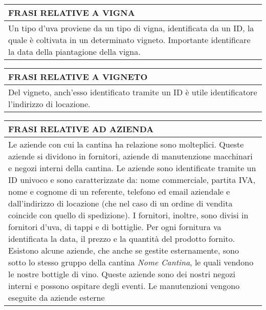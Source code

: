 \begin{center}
	\vspace{0.5cm}

	\begin{tabular}{P{16cm}}
		\toprule
		 \textbf {\large {FRASI RELATIVE A VIGNA}} \\
		\midrule
		Un tipo d'uva proviene da un tipo di vigna, identificata da un ID, la quale è coltivata in un determinato vigneto. Importante identificare la data della piantagione della vigna.\\
		\bottomrule
	\end{tabular}

	\vspace{0.5cm}
	
	\begin{tabular}{P{16cm}}
		\toprule
		 \textbf {\large {FRASI RELATIVE A VIGNETO}} \\
		\midrule
		Del vigneto, anch'esso identificato tramite un ID è utile identificatore l'indirizzo di locazione.\\
		\bottomrule
	\end{tabular}
	
	\vspace{0.5cm}
	
	\begin{tabular}{P{16cm}}
		\toprule
		 \textbf {\large {FRASI RELATIVE AD AZIENDA}} \\
		\midrule
		Le aziende con cui la cantina ha relazione sono molteplici. Queste aziende si dividono in fornitori, aziende di manutenzione macchinari e negozi interni della cantina. Le aziende sono identificate tramite un ID univoco e sono caratterizzate da: nome commerciale, partita IVA, nome e cognome di un referente, telefono ed email aziendale e dall'indirizzo di locazione (che nel caso di un ordine di vendita coincide con quello di spedizione). I fornitori, inoltre, sono divisi in fornitori d'uva, di tappi e di bottiglie. Per ogni fornitura va identificata la data, il prezzo e la quantità del prodotto fornito.
		Esistono alcune aziende, che anche se gestite esternamente, sono sotto lo stesso gruppo della cantina \emph{Nome Cantina}, le quali vendono le nostre bottigle di vino.
		Queste aziende sono dei nostri negozi interni e possono ospitare degli eventi. Le manutenzioni vengono eseguite da aziende esterne\\
		\bottomrule
	\end{tabular}
	
	\vspace{0.5cm}
	

\end{center}
